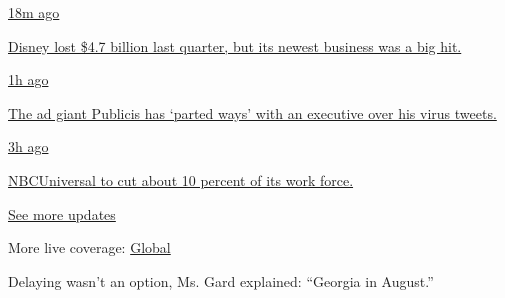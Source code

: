 \href{https://www.nytimes.com/live/2020/08/04/business/stock-market-today-coronavirus?action=click\&pgtype=Article\&state=default\&region=MAIN_CONTENT_1\&context=storylines_live_updates\#disney-lost-4-7-billion-last-quarter-but-its-newest-business-was-a-big-hit}{18m
ago}

\href{https://www.nytimes.com/live/2020/08/04/business/stock-market-today-coronavirus?action=click\&pgtype=Article\&state=default\&region=MAIN_CONTENT_1\&context=storylines_live_updates\#disney-lost-4-7-billion-last-quarter-but-its-newest-business-was-a-big-hit}{Disney
lost \$4.7 billion last quarter, but its newest business was a big hit.}

\href{https://www.nytimes.com/live/2020/08/04/business/stock-market-today-coronavirus?action=click\&pgtype=Article\&state=default\&region=MAIN_CONTENT_1\&context=storylines_live_updates\#the-ad-giant-publicis-has-parted-ways-with-an-executive-over-his-virus-tweets}{1h
ago}

\href{https://www.nytimes.com/live/2020/08/04/business/stock-market-today-coronavirus?action=click\&pgtype=Article\&state=default\&region=MAIN_CONTENT_1\&context=storylines_live_updates\#the-ad-giant-publicis-has-parted-ways-with-an-executive-over-his-virus-tweets}{The
ad giant Publicis has `parted ways' with an executive over his virus
tweets.}

\href{https://www.nytimes.com/live/2020/08/04/business/stock-market-today-coronavirus?action=click\&pgtype=Article\&state=default\&region=MAIN_CONTENT_1\&context=storylines_live_updates\#nbcuniversal-to-cut-about-10-percent-of-its-work-force}{3h
ago}

\href{https://www.nytimes.com/live/2020/08/04/business/stock-market-today-coronavirus?action=click\&pgtype=Article\&state=default\&region=MAIN_CONTENT_1\&context=storylines_live_updates\#nbcuniversal-to-cut-about-10-percent-of-its-work-force}{NBCUniversal
to cut about 10 percent of its work force.}

\href{https://www.nytimes.com/live/2020/08/04/business/stock-market-today-coronavirus?action=click\&pgtype=Article\&state=default\&region=MAIN_CONTENT_1\&context=storylines_live_updates}{See
more updates}

More live coverage:
\href{https://www.nytimes.com/2020/08/04/world/coronavirus-cases.html?action=click\&pgtype=Article\&state=default\&region=MAIN_CONTENT_1\&context=storylines_live_updates}{Global}

Delaying wasn't an option, Ms. Gard explained: ``Georgia in August.''


